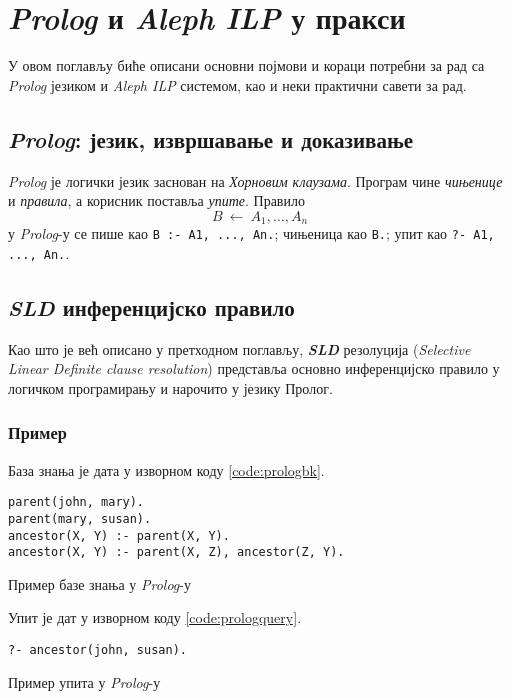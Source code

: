 \section{\emph{Prolog} и \emph{Aleph ILP} у пракси}

У овом поглављу биће описани основни појмови и кораци потребни за рад са \emph{Prolog} језиком и \emph{Aleph ILP} системом, као и неки практични савети за рад.

\subsection{\emph{Prolog}: језик, извршавање и доказивање}
\emph{Prolog} је логички језик заснован на \emph{Хорновим клаузама}. Програм чине \emph{чињенице} и \emph{правила}, а корисник поставља \emph{упите}. Правило
\[
B \ \leftarrow\ A_1,\dots,A_n
\]
у \emph{Prolog}-у се пише као \verb|B :- A1, ..., An.|; чињеница као \verb|B.|; упит као \verb|?- A1, ..., An.|. \cite{swi_prolog_docs}

\subsection{\emph{SLD} инференцијско правило}

Као што је већ описано у претходном поглављу, \textbf{\emph{SLD}} резолуција (\emph{Selective Linear Definite clause resolution}) представља основно инференцијско правило у логичком програмирању и нарочито у језику Пролог. 

\subsubsection{Пример}
База знања је дата у изворном коду \ref{code:prologbk}.

\begin{listing}[H]
\begin{verbatim}
parent(john, mary).
parent(mary, susan).
ancestor(X, Y) :- parent(X, Y).
ancestor(X, Y) :- parent(X, Z), ancestor(Z, Y).
\end{verbatim}
\caption{Пример базе знања у \emph{Prolog}-у}
\label{code:prologbk}
\end{listing}

Упит је дат у изворном коду \ref{code:prologquery}.
\begin{listing}[H]
\begin{verbatim}
?- ancestor(john, susan).
\end{verbatim}
\caption{Пример упита у \emph{Prolog}-у}
\label{code:prologquery}
\end{listing}

